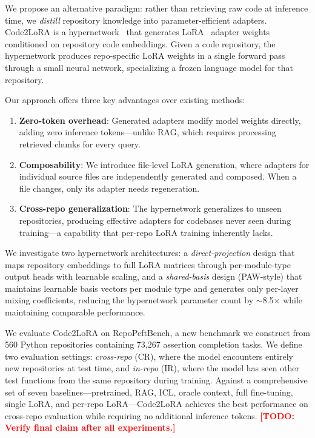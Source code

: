 \documentclass[11pt]{article}
\newcommand{\method}{Code2LoRA}
\newcommand{\benchmark}{RepoPeftBench}
\newcommand{\todo}[1]{\textcolor{red}{\textbf{[TODO: #1]}}}
\begin{document}
We propose an alternative paradigm: rather than retrieving raw code at inference time, we \emph{distill} repository knowledge into parameter-efficient adapters.
\method{} is a hypernetwork~\cite{ha2017hypernetworks} that generates LoRA~\cite{hu2022lora} adapter weights conditioned on repository code embeddings.
Given a code repository, the hypernetwork produces repo-specific LoRA weights in a single forward pass through a small neural network, specializing a frozen language model for that repository.

Our approach offers three key advantages over existing methods:
\begin{enumerate}[nosep]
    \item \textbf{Zero-token overhead}: Generated adapters modify model weights directly, adding zero inference tokens---unlike RAG, which requires processing retrieved chunks for every query.
    \item \textbf{Composability}: We introduce file-level LoRA generation, where adapters for individual source files are independently generated and composed. When a file changes, only its adapter needs regeneration.
    \item \textbf{Cross-repo generalization}: The hypernetwork generalizes to unseen repositories, producing effective adapters for codebases never seen during training---a capability that per-repo LoRA training inherently lacks.
\end{enumerate}

We investigate two hypernetwork architectures:
a \emph{direct-projection} design that maps repository embeddings to full LoRA matrices through per-module-type output heads with learnable scaling,
and a \emph{shared-basis} design (PAW-style) that maintains learnable basis vectors per module type and generates only per-layer mixing coefficients, reducing the hypernetwork parameter count by $\sim$8.5$\times$ while maintaining comparable performance.

We evaluate \method{} on \benchmark{}, a new benchmark we construct from 560 Python repositories containing 73,267 assertion completion tasks.
We define two evaluation settings: \emph{cross-repo} (CR), where the model encounters entirely new repositories at test time, and \emph{in-repo} (IR), where the model has seen other test functions from the same repository during training.
Against a comprehensive set of seven baselines---pretrained, RAG, ICL, oracle context, full fine-tuning, single LoRA, and per-repo LoRA---\method{} achieves the best performance on cross-repo evaluation while requiring no additional inference tokens.
\todo{Verify final claim after all experiments.}
\end{document}
